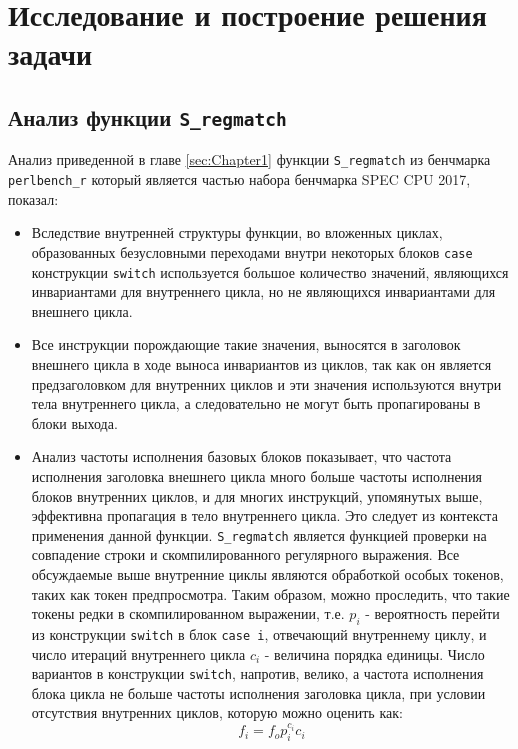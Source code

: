 \chapter{Исследование и построение решения задачи}
\label{sec:Chapter3} 

\section{Анализ функции \texttt{S\_regmatch}}

Анализ приведенной в главе \ref{sec:Chapter1} функции \texttt{S\_regmatch} из бенчмарка \texttt{perlbench\_r} который является частью набора бенчмарка SPEC CPU\textsuperscript{\tiny\textregistered} 2017, показал:
\begin{itemize}
    \item Вследствие внутренней структуры функции, во вложенных циклах, образованных безусловными переходами внутри некоторых блоков \texttt{case} конструкции \texttt{switch} используется большое количество значений, являющихся инвариантами для внутреннего цикла, но не являющихся инвариантами для внешнего цикла.
    \item Все инструкции порождающие такие значения, выносятся в заголовок внешнего цикла в ходе выноса инвариантов из циклов, так как он является предзаголовком для внутренних циклов и эти значения используются внутри тела внутреннего цикла, а следовательно не могут быть пропагированы в блоки выхода.
    \item Анализ частоты исполнения базовых блоков показывает, что частота исполнения заголовка внешнего цикла много больше частоты исполнения блоков внутренних циклов, и для многих инструкций, упомянутых выше, эффективна пропагация в тело внутреннего цикла.
        Это следует из контекста применения данной функции.
        \texttt{S\_regmatch} является функцией проверки на совпадение строки и скомпилированного регулярного выражения.
        Все обсуждаемые выше внутренние циклы являются обработкой особых токенов, таких как токен предпросмотра.
        Таким образом, можно проследить, что такие токены редки в скомпилированном выражении, т.е. $p_i$ - вероятность перейти из конструкции \texttt{switch} в блок \texttt{case i}, отвечающий внутреннему циклу, и число итераций внутреннего цикла $c_i$ - величина порядка единицы.
        Число вариантов в конструкции \texttt{switch}, напротив, велико, а частота исполнения блока цикла не больше частоты исполнения заголовка цикла, при условии отсутствия внутренних циклов, которую можно оценить как:
        $$ f_i = f_o  p_i^{c_i}  c_i $$

\end{itemize}
